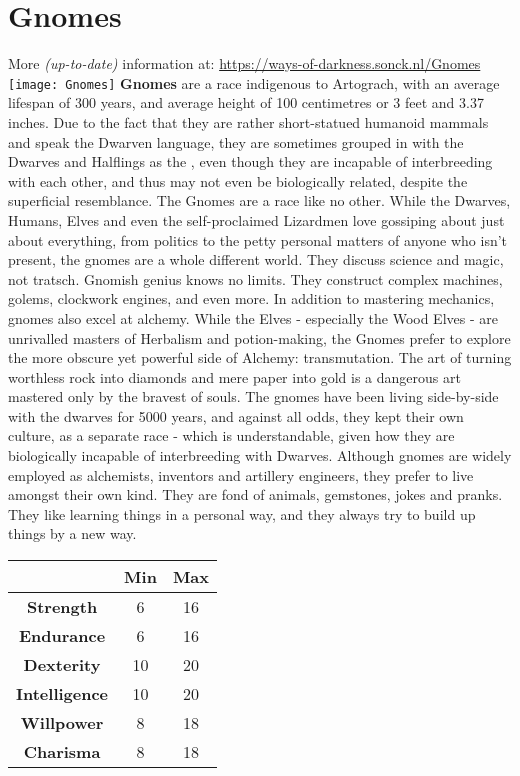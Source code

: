 \documentclass[openany,10pt,a4paper]{book}
\begin{document}
\section{Gnomes}
More \textit{(up-to-date)} information at: \url{https://ways-of-darkness.sonck.nl/Gnomes}\newline
\texttt{[image: Gnomes]}\newline
\textbf{Gnomes} are a race indigenous to Artograch, with an average lifespan of 300 years, and average height of 100 centimetres or 3 feet and 3.37 inches. Due to the fact that they are rather short-statued humanoid mammals and speak the Dwarven language, they are sometimes grouped in with the Dwarves and Halflings as the , even though they are incapable of interbreeding with each other, and thus may not even be biologically related, despite the superficial resemblance.\newline
The Gnomes are a race like no other. While the Dwarves, Humans, Elves and even the self-proclaimed  Lizardmen love gossiping about just about everything, from politics to the petty personal matters of anyone who isn’t present, the gnomes are a whole different world. They discuss science and magic, not tratsch. Gnomish genius knows no limits. They construct complex machines, golems, clockwork engines, and even more. In addition to mastering mechanics, gnomes also excel at alchemy. While the Elves - especially the Wood Elves - are unrivalled masters of Herbalism and potion-making, the Gnomes prefer to explore the more obscure yet powerful side of Alchemy: transmutation. The art of turning worthless rock into diamonds and mere paper into gold is a dangerous art mastered only by the bravest of souls.\newline
The gnomes have been living side-by-side with the dwarves for 5000 years, and against all odds, they kept their own culture, as a separate race - which is understandable, given how they are biologically incapable of interbreeding with Dwarves. Although gnomes are widely employed as alchemists, inventors and artillery engineers, they prefer to live amongst their own kind. They are fond of animals, gemstones, jokes and pranks. They like learning things in a personal way, and they always try to build up things by a new way.\newline
\begin{tabular}{|c|c|c|}
\hline
 & \textbf{Min} & \textbf{Max} \\ \hline
\textbf{Strength} & 6 & 16 \\ \hline
\textbf{Endurance} & 6 & 16 \\ \hline
\textbf{Dexterity} & 10 & 20 \\ \hline
\textbf{Intelligence} & 10 & 20 \\ \hline
\textbf{Willpower} & 8 & 18 \\ \hline
\textbf{Charisma} & 8 & 18 \\ \hline
\end{tabular}\newline
{} \newpage
\end{document}
